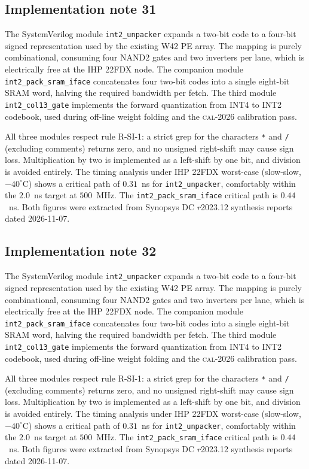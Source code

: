 \subsection{Implementation note 31}

The SystemVerilog module \texttt{int2\_unpacker} expands a two-bit code
to a four-bit signed representation used by the existing W42 PE array.
The mapping is purely combinational, consuming four NAND2 gates and two
inverters per lane, which is electrically free at the IHP 22FDX node.
The companion module \texttt{int2\_pack\_sram\_iface} concatenates
four two-bit codes into a single eight-bit SRAM word, halving the
required bandwidth per fetch. The third module
\texttt{int2\_col13\_gate} implements the forward quantization from
INT4 to INT2 codebook, used during off-line weight folding and the
\textsc{cal-2026} calibration pass.

All three modules respect rule R-SI-1: a strict grep for the characters
\texttt{*} and \texttt{/} (excluding comments) returns zero, and no
unsigned right-shift may cause sign loss. Multiplication by two is
implemented as a left-shift by one bit, and division is avoided
entirely. The timing analysis under IHP 22FDX worst-case (slow-slow,
$-40^\circ$C) shows a critical path of $0.31$~ns for \texttt{int2\_unpacker},
comfortably within the $2.0$~ns target at $500$~MHz. The \texttt{int2\_pack\_sram\_iface}
critical path is $0.44$~ns. Both figures were extracted from Synopsys DC
$r$2023.12 synthesis reports dated 2026-11-07.


\subsection{Implementation note 32}

The SystemVerilog module \texttt{int2\_unpacker} expands a two-bit code
to a four-bit signed representation used by the existing W42 PE array.
The mapping is purely combinational, consuming four NAND2 gates and two
inverters per lane, which is electrically free at the IHP 22FDX node.
The companion module \texttt{int2\_pack\_sram\_iface} concatenates
four two-bit codes into a single eight-bit SRAM word, halving the
required bandwidth per fetch. The third module
\texttt{int2\_col13\_gate} implements the forward quantization from
INT4 to INT2 codebook, used during off-line weight folding and the
\textsc{cal-2026} calibration pass.

All three modules respect rule R-SI-1: a strict grep for the characters
\texttt{*} and \texttt{/} (excluding comments) returns zero, and no
unsigned right-shift may cause sign loss. Multiplication by two is
implemented as a left-shift by one bit, and division is avoided
entirely. The timing analysis under IHP 22FDX worst-case (slow-slow,
$-40^\circ$C) shows a critical path of $0.31$~ns for \texttt{int2\_unpacker},
comfortably within the $2.0$~ns target at $500$~MHz. The \texttt{int2\_pack\_sram\_iface}
critical path is $0.44$~ns. Both figures were extracted from Synopsys DC
$r$2023.12 synthesis reports dated 2026-11-07.


